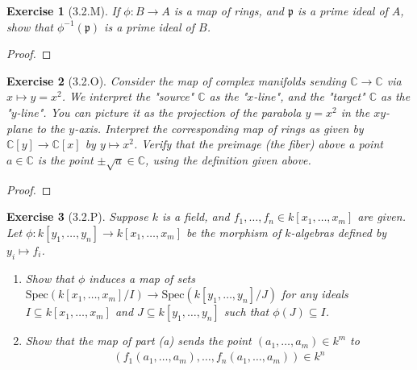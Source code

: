 \documentclass{amsart}
\newtheorem*{exercise*}{Exercise}
\newcommand{\C}{\mathbb{C}}
\begin{document}
\vspace{0.1in}


\begin{exercise*}[3.2.M]
    If $\phi:B\rightarrow A$ is a map of rings, and $\mathfrak{p}$ is a prime ideal of $A$, show that $\phi^{-1}(\mathfrak{p})$ is a prime ideal of $B$. 
\end{exercise*}

\vspace{0.1in}

\begin{proof}
	
\end{proof}

\vspace{0.1in}


\begin{exercise*}[3.2.O]
    Consider the map of complex manifolds sending $\C\rightarrow \C$ via $x\mapsto y=x^2$. We interpret the "source" $\C$ as the "$x$-line", and the "target" $\C$ as the "$y$-line". You can picture it as the projection of the parabola $y=x^2$ in the $xy$-plane to the $y$-axis. Interpret the corresponding map of rings as given by $\C[y]\rightarrow\C[x]$ by $y\mapsto x^2$. Verify that the preimage (the fiber) above a point $a\in\C$ is the point $\pm\sqrt{a}\in\C$, using the definition given above. 
\end{exercise*}

\vspace{0.1in}

\begin{proof}
	
\end{proof}

\vspace{0.1in}


\begin{exercise*}[3.2.P]
    Suppose $k$ is a field, and $f_1, \ldots, f_n\in k[x_1,\ldots, x_m]$ are given. Let $\phi:k[y_1, \ldots, y_n]\rightarrow k[x_1, \ldots, x_m]$ be the morphism of $k$-algebras defined by $y_i\mapsto f_i$. 
    \begin{enumerate}
        \item[(a)] Show that $\phi$ induces a map of sets $\mathrm{Spec}(k[x_1, \ldots, x_m]/I)\rightarrow \mathrm{Spec}(k[y_1, \ldots, y_n]/J)$ for any ideals $I\subseteq k[x_1, \ldots, x_m]$ and $J\subseteq k[y_1, \ldots, y_n]$ such that $\phi(J)\subseteq I$.
        \item[(b)] Show that the map of part (a) sends the point $(a_1, \ldots, a_m)\in k^m$ to
        \begin{align*}
            (f_1(a_1,\ldots, a_m), \ldots, f_n(a_1,\ldots,a_m))\in k^n
        \end{align*}
    \end{enumerate}
\end{exercise*}
\end{document}
